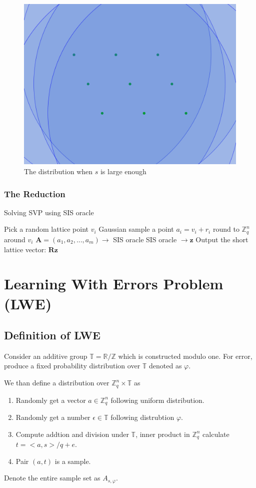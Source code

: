 \documentclass{beamer}
\begin{document}
	\begin{frame}
		\begin{figure}[H]
			\centering
			\includegraphics[width=0.5\linewidth]{./image/gaussian_3.png}
			\caption{The distribution when $s$ is large enough}%
			\label{fig:gaussian_3}
		\end{figure}
	\end{frame}
	\subsubsection{The Reduction}
			\begin{algorithm}
			\caption{Solving SVP using SIS oracle}
			\label{alg:decision_to_search}
			\begin{algorithmic}
				\STATE Pick a random lattice point $v_i$
				\STATE Gaussian sample a point $a_i=v_i+r_i$ round to $\mathbb{Z}^n_q$ around $v_i$
				\ENDFOR
				\STATE $\mathbf{A}=(a_1,a_2,...,a_m)\rightarrow$ SIS oracle
				\STATE SIS oracle $\rightarrow \mathbf{z}$ 
				\STATE Output the short lattice vector: $\mathbf{R}\mathbf{z}$
			\end{algorithmic}
		\end{algorithm}
	\section{Learning With Errors Problem (LWE)}
	\subsection{Definition of LWE}
	Consider an additive group $\mathbb{T}=\mathbb{R}/\mathbb{Z}$ which is constructed modulo one. For error, produce a fixed probability distribution over $\mathbb{T}$ denoted as $\varphi$. 
	
	We than define a distribution over $\mathbb{Z}_q^n\times \mathbb{T}$ as
	\begin{enumerate}
		\item Randomly get a vector $a\in \mathbb{Z}_q^n$ following uniform distribution.
		\item Randomly get a number $\epsilon\in\mathbb{T}$ following distrubtion $\varphi$.
		\item Compute addtion and division under $\mathbb{T}$, inner product in $\mathbb{Z}_q^n$ calculate $t=<a,s>/q+e$.
		\item Pair $(a,t)$ is a sample.
	\end{enumerate}
	Denote the entire sample set as $A_{s,\varphi}$.
\end{document}
